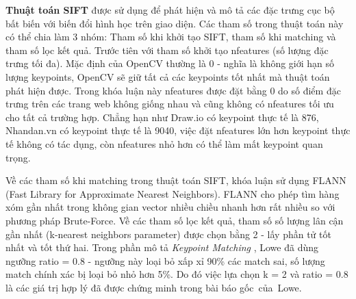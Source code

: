 \documentclass[a4paper, 12pt]{report}
\begin{document}
{%

\textbf{Thuật toán SIFT } \cite{lowe2004distinctive} được sử dụng để phát hiện và mô tả các đặc trưng cục bộ bất biến với biến đổi hình học trên giao diện. Các tham số trong thuật toán này có thể chia làm 3 nhóm: Tham số khi khởi tạo SIFT, tham số khi matching và tham số lọc kết quả. Trước tiên với tham số khởi tạo nfeatures (số lượng đặc trưng tối đa). Mặc định của OpenCV thường là 0 - nghĩa là không giới hạn số lượng keypoints, OpenCV sẽ giữ tất cả các keypoints tốt nhất mà thuật toán phát hiện được. Trong khóa luận này nfeatures được đặt bằng 0 do số điểm đặc trưng trên các trang web không giống nhau và cũng không có nfeatures tối ưu cho tất cả trường hợp. Chẳng hạn như Draw.io có keypoint thực tế là 876, Nhandan.vn có keypoint thực tế là 9040, việc đặt nfeatures lớn hơn keypoint thực tế không có tác dụng, còn nfeatures nhỏ hơn có 
thể làm mất keypoint quan trọng. 



Về các tham số khi matching trong thuật toán SIFT, khóa luận sử dụng FLANN (Fast Library for Approximate Nearest Neighbors). FLANN cho phép tìm hàng xóm gần nhất trong không gian vector nhiều chiều nhanh hơn rất nhiều so với phương pháp Brute-Force. Về các tham số lọc kết quả, tham số số lượng lân cận gần nhất (k-nearest neighbors parameter) được chọn bằng 2 - lấy phần tử tốt nhất và tốt thứ hai. Trong phần mô tả \textit{Keypoint Matching} \cite{lowe2004distinctive}, Lowe đã dùng ngưỡng ratio = 0.8 - ngưỡng này loại bỏ xấp xỉ 90\% các match sai, số lượng match chính xác bị loại bỏ nhỏ hơn 5\%. Do đó việc lựa chọn k = 2 và ratio = 0.8 là các giá trị hợp lý đã được chứng minh trong bài báo gốc~của~Lowe.




}
\end{document}
